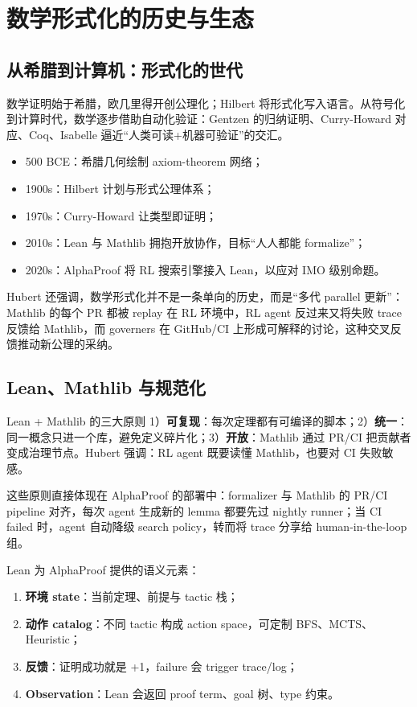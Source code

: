 \section{数学形式化的历史与生态}

\subsection{从希腊到计算机：形式化的世代}
数学证明始于希腊，欧几里得开创公理化；Hilbert 将形式化写入语言。从符号化到计算时代，数学逐步借助自动化验证：Gentzen 的归纳证明、Curry-Howard 对应、Coq、Isabelle 逼近“人类可读+机器可验证”的交汇。
\begin{itemize}
    \item 500 BCE：希腊几何绘制 axiom-theorem 网络；
    \item 1900s：Hilbert 计划与形式公理体系；
    \item 1970s：Curry-Howard 让类型即证明；
    \item 2010s：Lean 与 Mathlib 拥抱开放协作，目标“人人都能 formalize”；
    \item 2020s：AlphaProof 将 RL 搜索引擎接入 Lean，以应对 IMO 级别命题。
\end{itemize}

Hubert 还强调，数学形式化并不是一条单向的历史，而是“多代 parallel 更新”：Mathlib 的每个 PR 都被 replay 在 RL 环境中，RL agent 反过来又将失败 trace 反馈给 Mathlib，而 governers 在 GitHub/CI 上形成可解释的讨论，这种交叉反馈推动新公理的采纳。

\subsection{Lean、Mathlib 与规范化}
\begin{importantbox}{Lean + Mathlib 的三大原则}
1）\textbf{可复现}：每次定理都有可编译的脚本；2）\textbf{统一}：同一概念只进一个库，避免定义碎片化；3）\textbf{开放}：Mathlib 通过 PR/CI 把贡献者变成治理节点。Hubert 强调：RL agent 既要读懂 Mathlib，也要对 CI 失败敏感。
\end{importantbox}

这些原则直接体现在 AlphaProof 的部署中：formalizer 与 Mathlib 的 PR/CI pipeline 对齐，每次 agent 生成新的 lemma 都要先过 nightly runner；当 CI failed 时，agent 自动降级 search policy，转而将 trace 分享给 human-in-the-loop 组。

Lean 为 AlphaProof 提供的语义元素：
\begin{enumerate}
    \item \textbf{环境 state}：当前定理、前提与 tactic 栈；
    \item \textbf{动作 catalog}：不同 tactic 构成 action space，可定制 BFS、MCTS、Heuristic；
    \item \textbf{反馈}：证明成功就是 +1，failure 会 trigger trace/log；
    \item \textbf{Observation}：Lean 会返回 proof term、goal 树、type 约束。
\end{enumerate}

